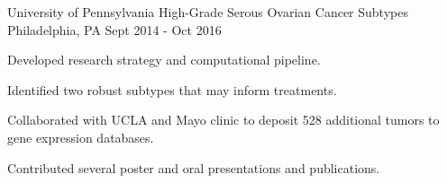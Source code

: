 \begin{cventries}
  \cventry
    {University of Pennsylvania} %
    {High-Grade Serous Ovarian Cancer Subtypes} %
    {Philadelphia, PA} %
    {Sept 2014 - Oct 2016} %
    {
      \begin{cvitems} %
        \item {Developed research strategy and computational pipeline.}
        \item {Identified two robust subtypes that may inform treatments.}
        \item {Collaborated with UCLA and Mayo clinic to deposit 528 additional
              tumors to gene expression databases.}
        \item {Contributed several poster and oral presentations and
               publications.}
      \end{cvitems}
    }

\end{cventries}
